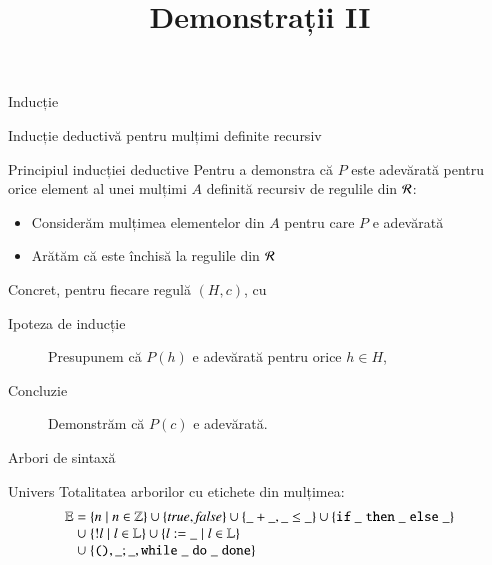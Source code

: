\documentclass[xcolor=pdftex,romanian,colorlinks,handout]{beamer}
\title[SLP---Demonstrații]{Demonstrații II}
\begin{document}
\begin{frame}
  \titlepage
\end{frame}


\begin{section}{Inducție}

\begin{frame}{Inducție deductivă pentru mulțimi definite recursiv}

\begin{block}{Principiul inducției deductive}
Pentru a demonstra că $P$ este adevărată pentru orice element al unei mulțimi $A$ definită recursiv de regulile din $\cal R$:
\begin{itemize}
  \item Considerăm mulțimea elementelor din $A$ pentru care $P$ e adevărată
 \item Arătăm că este închisă la regulile din $\cal R$
\end{itemize}

Concret, pentru fiecare regulă $(H,c)$, cu 
\begin{description} 
\item[Ipoteza de inducție] Presupunem că $P(h)$ e adevărată pentru orice $h\in H$,
\item[Concluzie] Demonstrăm că $P(c)$ e adevărată.
\end{description}	
\end{block}
\end{frame}


\begin{frame}{Arbori de sintaxă}

\begin{block}{Univers}
Totalitatea arborilor cu etichete din mulțimea:
\[\begin{array}{r@{\;}l}\mathbb{E} = & \{n\mid n\in\mathbb{Z}\} \cup \{\Strue, \Sfalse\}\cup \{\_+\_, \_\leq\_\} \cup \{\Sif\_\Sthen\_\Selse\_\}
\\ 
\cup &
\{! l \mid l\in  \mathbb{L}\}\cup \{l :=\_\mid l\in \mathbb{L}\}
\\
\cup &
\{\Sskip, \_;\_, \Swhile\_\Sdo\_\Sdone\}
\end{array}\]
\end{block}


\end{frame}
\end{section}
\end{document}
